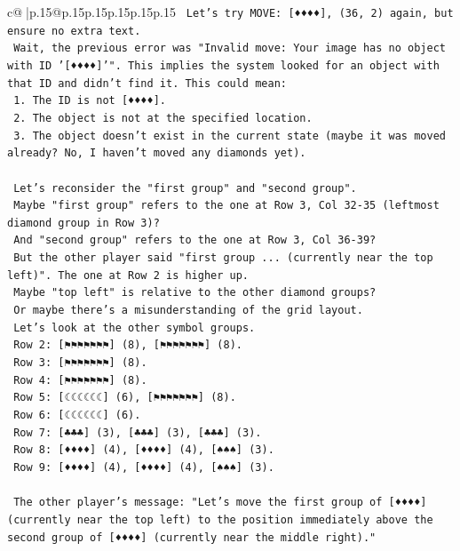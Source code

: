 \documentclass{article}
\begin{document}
{\begin{supertabular}{c@{$\;$}|p{.15\linewidth}@{}p{.15\linewidth}p{.15\linewidth}p{.15\linewidth}p{.15\linewidth}p{.15\linewidth}}
{{{\texttt{    Let's try MOVE: {[}♦♦♦♦{]}, (36, 2) again, but ensure no extra text.} \\
\texttt{    Wait, the previous error was "Invalid move: Your image has no object with ID '{[}♦♦♦♦{]}'". This implies the system looked for an object with that ID and didn't find it. This could mean:} \\
\texttt{    1. The ID is not {[}♦♦♦♦{]}.} \\
\texttt{    2. The object is not at the specified location.} \\
\texttt{    3. The object doesn't exist in the current state (maybe it was moved already? No, I haven't moved any diamonds yet).} \\
\\ 
\texttt{    Let's reconsider the "first group" and "second group".} \\
\texttt{    Maybe "first group" refers to the one at Row 3, Col 32{-}35 (leftmost diamond group in Row 3)?} \\
\texttt{    And "second group" refers to the one at Row 3, Col 36{-}39?} \\
\texttt{    But the other player said "first group ... (currently near the top left)". The one at Row 2 is higher up.} \\
\texttt{    Maybe "top left" is relative to the other diamond groups?} \\
\texttt{    Or maybe there's a misunderstanding of the grid layout.} \\
\texttt{    Let's look at the other symbol groups.} \\
\texttt{    Row 2: {[}⚑⚑⚑⚑⚑⚑⚑{]} (8), {[}⚑⚑⚑⚑⚑⚑⚑{]} (8).} \\
\texttt{    Row 3: {[}⚑⚑⚑⚑⚑⚑⚑{]} (8).} \\
\texttt{    Row 4: {[}⚑⚑⚑⚑⚑⚑⚑{]} (8).} \\
\texttt{    Row 5: {[}☾☾☾☾☾☾{]} (6), {[}⚑⚑⚑⚑⚑⚑⚑{]} (8).} \\
\texttt{    Row 6: {[}☾☾☾☾☾☾{]} (6).} \\
\texttt{    Row 7: {[}♣♣♣{]} (3), {[}♣♣♣{]} (3), {[}♣♣♣{]} (3).} \\
\texttt{    Row 8: {[}♦♦♦♦{]} (4), {[}♦♦♦♦{]} (4), {[}♠♠♠{]} (3).} \\
\texttt{    Row 9: {[}♦♦♦♦{]} (4), {[}♦♦♦♦{]} (4), {[}♠♠♠{]} (3).} \\
\\ 
\texttt{    The other player's message: "Let's move the first group of {[}♦♦♦♦{]} (currently near the top left) to the position immediately above the second group of {[}♦♦♦♦{]} (currently near the middle right)."} \\
}}}
\end{supertabular}}
\end{document}
